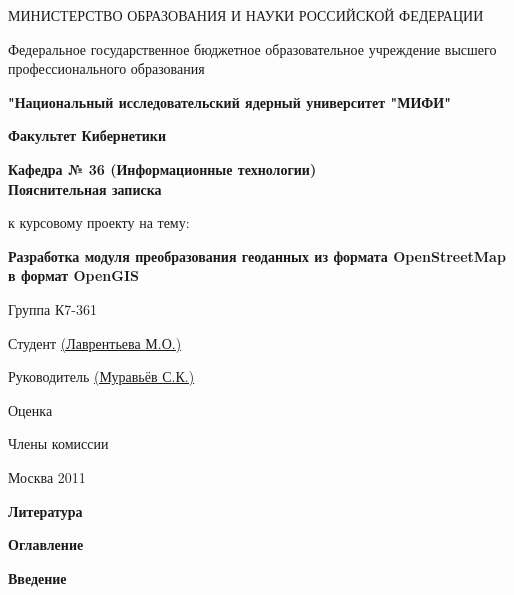 \documentclass[12pt,a4paper,oneside]{article} %
\begin{document}
\sloppy
\onehalfspacing
\pagestyle{empty} %
\newpage
\begin{center}
{\small МИНИСТЕРСТВО ОБРАЗОВАНИЯ И НАУКИ РОССИЙСКОЙ ФЕДЕРАЦИИ

Федеральное государственное бюджетное образовательное учреждение высшего профессионального образования

\textbf{"Национальный исследовательский ядерный университет "МИФИ"}
\\[50pt]
}
\textbf{Факультет Кибернетики}

\textbf{Кафедра № 36 (Информационные технологии)
\\[50pt]
\Large{Пояснительная записка}}

к курсовому проекту на тему:

\textbf{Разработка модуля преобразования геоданных из формата OpenStreetMap в формат OpenGIS}
\\[60pt]
\end{center}
\begin{flushleft}
Группа К7-361

Студент \underline{\hspace{9,5cm} (Лаврентьева М.О.)}

Руководитель \underline{\hspace{9cm} (Муравьёв С.К.)}

Оценка \underline{\hspace{14,25cm}}

Члены комиссии \underline{\hspace{12,2cm}}

\hspace{3,7cm} \underline{\hspace{12,2cm}}

\hspace{3,7cm} \underline{\hspace{12,2cm}}

\hspace{3,7cm} \underline{\hspace{12,2cm}}

\end{flushleft}
\begin{center}
\vfill
Москва 2011
\end{center}
\newpage
\begin{center}
\textbf{Литература}
\end{center}
\newpage
\begin{center}
\textbf{Оглавление}
\end{center}
\newpage
\begin{center}
\textbf{Введение}
\end{center}
\end{document}
